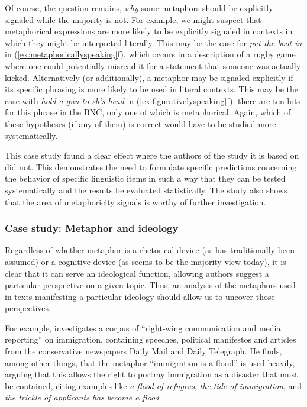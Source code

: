 Of course, the question remains, \textit{why} some metaphors  should be explicitly signaled while the majority is not. For example, we might suspect that metaphorical expressions are more likely to be explicitly signaled in contexts in which they might be interpreted literally.  This may be the case for \textit{put the boot in} in (\ref{ex:metaphoricallyspeaking}f), which occurs in a description of a rugby game where one could potentially misread it for a statement that someone was actually kicked. Alternatively (or additionally), a metaphor may be signaled explicitly if its specific phrasing is more likely to be used in literal  contexts. This may be the case with \textit{hold a gun to sb's head} in (\ref{ex:figurativelyspeaking}f): there are ten hits for this phrase in the BNC,  only one of which is metaphorical. Again, which of these hypotheses (if any of them) is correct would have to be studied more systematically.

This case study found a clear effect where the authors of the study it is based on did not. This demonstrates the need to formulate specific predictions concerning the behavior of specific linguistic items in such a way that they can be tested systematically and the results be evaluated statistically. The study also shows that the area of metaphoricity  signals  is worthy of further investigation.

\subsubsection{Case study: Metaphor and ideology}
\label{sec:metaphorandideology}

Regardless of whether metaphor is a rhetorical device (as has traditionally been assumed) or a cognitive  device (as seems to be the majority view today), it is clear that it can serve an ideological  function, allowing authors suggest a particular perspective on a given topic. Thus, an analysis of the metaphors  used in texts manifesting a particular ideology should allow us to uncover those perspectives.

For example, \citet{charteris-black_politicians_2005} investigates a corpus of ``right\hyp{}wing communication and media reporting'' on immigration, containing speeches, political manifestos and articles from the conservative newspapers  Daily Mail and Daily Telegraph. He finds, among other things, that the metaphor  ``immigration is a flood'' is used heavily, arguing that this allows the right to portray immigration as a disaster that must be contained, citing examples like \textit{a flood of refugees}, \textit{the tide of immigration}, and \textit{the trickle of applicants has become a flood}.

